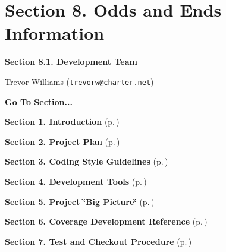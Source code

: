 \section{Section 8.  Odds and Ends Information}\label{page_misc}
 \begin{Desc}
\item[{\bf Section 8.1.  Development Team}]\par
\begin{CompactItemize}
\item 
Trevor Williams ({\tt trevorw@charter.net})\end{CompactItemize}
\end{Desc}


\begin{Desc}
\item[{\bf Go To Section...}]\par
\begin{CompactItemize}
\item 
{\bf Section 1.  Introduction} {\rm (p.\,\pageref{page_intro})}\item 
{\bf Section 2.  Project Plan} {\rm (p.\,\pageref{page_project_plan})}\item 
{\bf Section 3.  Coding Style Guidelines} {\rm (p.\,\pageref{page_code_style})}\item 
{\bf Section 4.  Development Tools} {\rm (p.\,\pageref{page_tools})}\item 
{\bf Section 5.  Project \char`\"{}Big Picture\char`\"{}} {\rm (p.\,\pageref{page_big_picture})}\item 
{\bf Section 6.  Coverage Development Reference} {\rm (p.\,\pageref{page_code_details})}\item 
{\bf Section 7.  Test and Checkout Procedure} {\rm (p.\,\pageref{page_testing})}\end{CompactItemize}
\end{Desc}
